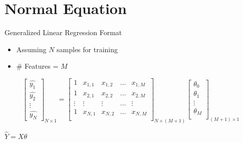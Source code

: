 \documentclass{beamer}
\begin{document}
\section{Normal Equation}
\begin{frame}{Generalized Linear Regression Format}
\begin{itemize}[<+->]
	\item Assuming $N$ samples for training
	\item \# Features = $M$
\end{itemize}


   \pause \[\begin{bmatrix}
        \hat{y_{1}}\\
        \hat{y_{2}} \\
        \vdots \\
        \hat{y_{N}}
    \end{bmatrix}_{N \times 1}
    =     \begin{bmatrix}
        1 & x_{1,1} & x_{1,2} & \dots & x_{1,M}\\
        1 & x_{2,1} & x_{2,2} & \dots & x_{2,M}\\
        \vdots & \vdots & \vdots & \dots & \vdots\\
        1 & x_{N,1} & x_{N,2} & \dots & x_{N,M}\\
    \end{bmatrix}_{N \times (M+1)}
    \begin{bmatrix}
        \theta_{0}\\
        \theta_{1}\\
        \vdots \\
        \theta_{M}\\
    \end{bmatrix}_{(M+1)\times 1}
   \]
   
   
  \pause  \begin{tcolorbox}
   \begin{center}
       
   

   $ \hat{Y} = X\theta$
   \end{center}
   \end{tcolorbox}

   
\end{frame}
\end{document}
